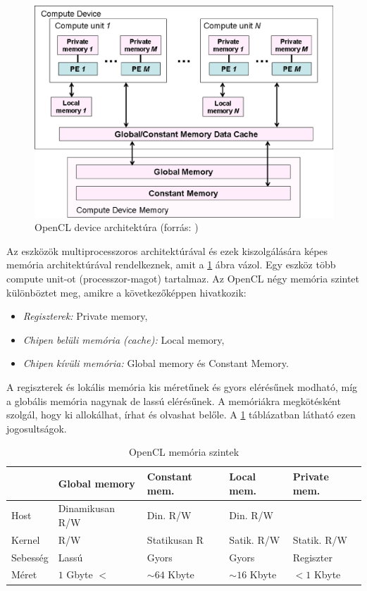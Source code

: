 	\begin{figure}[!h]
		\centering
		\includegraphics[width=0.6\columnwidth]{figures/eps/device.eps}
		\caption{OpenCL device architektúra (forrás: \cite{opencl})} 
		\label{fig:device} 
	\end{figure}
	Az eszközök multiprocesszoros architektúrával és ezek kiszolgálására képes
	memória architektúrával rendelkeznek, amit a \ref{fig:device} ábra vázol.
	Egy eszköz több compute unit-ot (processzor-magot) tartalmaz.
	Az OpenCL négy memória szintet különböztet meg, amikre a
	következőképpen hivatkozik:
	\begin{itemize}
		\item \emph{Regiszterek:} Private memory,
		\item \emph{Chipen belüli memória (cache):} Local memory,
		\item \emph{Chipen kívüli memória:} Global memory és Constant Memory.
	\end{itemize}
	A regiszterek és lokális memória kis méretűnek és gyors elérésűnek modható, míg
	a globális memória nagynak de lassú elérésűnek.
	A memóriákra megkötésként szolgál, hogy ki allokálhat, írhat és olvashat
	belőle. A \ref{table:mem} táblázatban látható ezen jogosultságok.
	\begin{table}[!h]
	\caption{OpenCL memória szintek}
	\label{table:mem}
	\centering
	\begin{tabular}{l|l|l|l|l}
			 & Global memory & Constant mem. & Local mem. & Private mem.\\ \hline
		Host & Dinamikusan R/W & Din. R/W & Din. R/W & \\
		Kernel & R/W & Statikusan R & Satik. R/W & Statik. R/W\\
		Sebesség & Lassú & Gyors & Gyors & Regiszter\\
		Méret & $1$ Gbyte $<$ & $\sim64$ Kbyte& $\sim16$ Kbyte & $<1$ Kbyte
	\end{tabular}
	\end{table}
	

